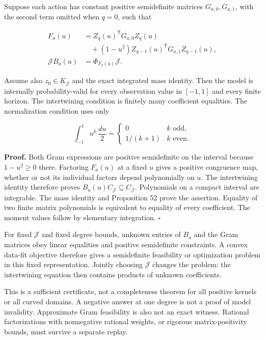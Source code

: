 \documentclass[11pt,letterpaper]{article}
\begin{document}
Suppose each action has constant positive semidefinite matrices
\(G_{a,0},G_{a,1}\), with the second term omitted when \(q=0\), such
that

\[
\begin{aligned}
F_a(u)&=Z_q(u)^{\mathsf T}G_{a,0}Z_q(u)\\
&\quad +(1-u^2)Z_{q-1}(u)^{\mathsf T}G_{a,1}Z_{q-1}(u),\\
\mathcal J B_a(u)&=\Phi_{F_a(u)}\mathcal J.
\end{aligned}
\]

Assume also \(z_0\in K_{\mathcal J}\) and the exact integrated mass
identity. Then the model is internally probability-valid for every
observation value in \([-1,1]\) and every finite horizon. The
intertwining condition is finitely many coefficient equalities. The
normalization condition uses only

\[
\int_{-1}^1u^k\,\frac{du}{2}
=\begin{cases}0&k\text{ odd},\\1/(k+1)&k\text{ even}.\end{cases}
\]

\textbf{Proof.} Both Gram expressions are positive semidefinite on the
interval because \(1-u^2\geq0\) there. Factoring \(F_a(u)\) at a fixed
\(u\) gives a positive congruence map, whether or not its individual
factors depend polynomially on \(u\). The intertwining identity
therefore proves \(B_a(u)C_{\mathcal J}\subseteq C_{\mathcal J}\).
Polynomials on a compact interval are integrable. The mass identity and
Proposition 52 prove the assertion. Equality of two finite matrix
polynomials is equivalent to equality of every coefficient. The moment
values follow by elementary integration. \(\square\)

For fixed \(\mathcal J\) and fixed degree bounds, unknown entries of
\(B_a\) and the Gram matrices obey linear equalities and positive
semidefinite constraints. A convex data-fit objective therefore gives a
semidefinite feasibility or optimization problem in this fixed
representation. Jointly choosing \(\mathcal J\) changes the problem: the
intertwining equation then contains products of unknown coefficients.

This is a sufficient certificate, not a completeness theorem for all
positive kernels or all curved domains. A negative answer at one degree
is not a proof of model invalidity. Approximate Gram feasibility is also
not an exact witness. Rational factorizations with nonnegative rational
weights, or rigorous matrix-positivity bounds, must survive a separate
replay.
\end{document}

